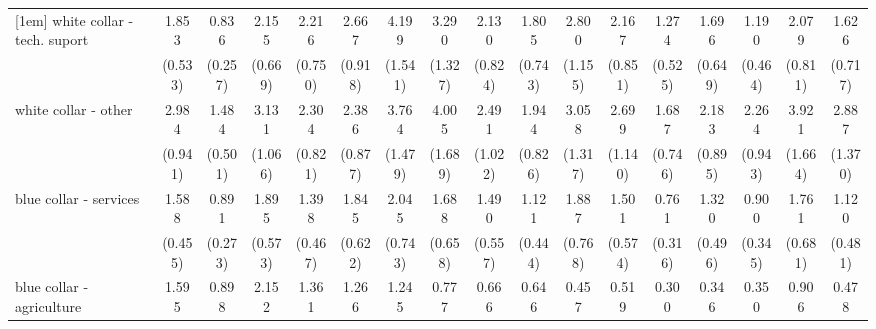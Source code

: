 {\begin{tabular}{l*{16}{c}}
[1em]
white collar - tech. suport&       1.853\sym{*}  &       0.836         &       2.155\sym{*}  &       2.216\sym{*}  &       2.667\sym{**} &       4.199\sym{***}&       3.290\sym{**} &       2.130         &       1.805         &       2.800\sym{*}  &       2.167\sym{*}  &       1.274         &       1.696         &       1.190         &       2.079         &       1.626         \\
                    &     (0.533)         &     (0.257)         &     (0.669)         &     (0.750)         &     (0.918)         &     (1.541)         &     (1.327)         &     (0.824)         &     (0.743)         &     (1.155)         &     (0.851)         &     (0.525)         &     (0.649)         &     (0.464)         &     (0.811)         &     (0.717)         \\
[1em]
white collar - other&       2.984\sym{***}&       1.484         &       3.131\sym{***}&       2.304\sym{*}  &       2.386\sym{*}  &       3.764\sym{***}&       4.005\sym{***}&       2.491\sym{*}  &       1.944         &       3.058\sym{**} &       2.699\sym{*}  &       1.687         &       2.183         &       2.264\sym{*}  &       3.921\sym{**} &       2.887\sym{*}  \\
                    &     (0.941)         &     (0.501)         &     (1.066)         &     (0.821)         &     (0.877)         &     (1.479)         &     (1.689)         &     (1.022)         &     (0.826)         &     (1.317)         &     (1.140)         &     (0.746)         &     (0.895)         &     (0.943)         &     (1.664)         &     (1.370)         \\
[1em]
blue collar - services&       1.588         &       0.891         &       1.895\sym{*}  &       1.398         &       1.845         &       2.045\sym{*}  &       1.688         &       1.490         &       1.121         &       1.887         &       1.501         &       0.761         &       1.320         &       0.900         &       1.761         &       1.120         \\
                    &     (0.455)         &     (0.273)         &     (0.573)         &     (0.467)         &     (0.622)         &     (0.743)         &     (0.658)         &     (0.557)         &     (0.444)         &     (0.768)         &     (0.574)         &     (0.316)         &     (0.496)         &     (0.345)         &     (0.681)         &     (0.481)         \\
[1em]
blue collar - agriculture&       1.595         &       0.898         &       2.152         &       1.361         &       1.266         &       1.245         &       0.777         &       0.666         &       0.646         &       0.457         &       0.519         &       0.300\sym{*}  &       0.346\sym{*}  &       0.350\sym{*}  &       0.906         &       0.478         \\

\end{tabular}}
